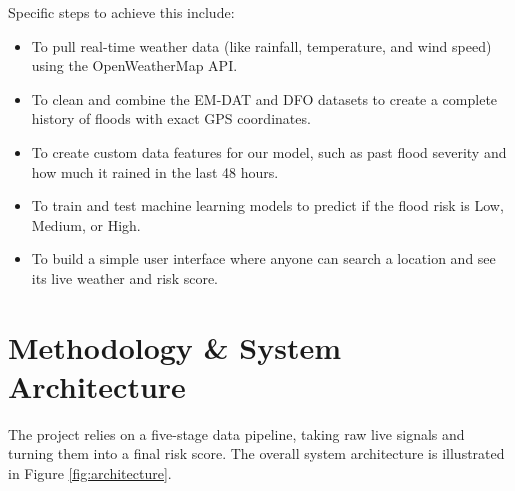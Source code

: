\documentclass[11pt,a4paper]{article}
\begin{document}
Specific steps to achieve this include:
\begin{itemize}[noitemsep]
    \item To pull real-time weather data (like rainfall, temperature, and wind speed) using the OpenWeatherMap API.
    \item To clean and combine the EM-DAT and DFO datasets to create a complete history of floods with exact GPS coordinates.
    \item To create custom data features for our model, such as past flood severity and how much it rained in the last 48 hours.
    \item To train and test machine learning models to predict if the flood risk is Low, Medium, or High.
    \item To build a simple user interface where anyone can search a location and see its live weather and risk score.
\end{itemize}

\section{Methodology \& System Architecture}
The project relies on a five-stage data pipeline, taking raw live signals and turning them into a final risk score. The overall system architecture is illustrated in Figure \ref{fig:architecture}.
\end{document}
